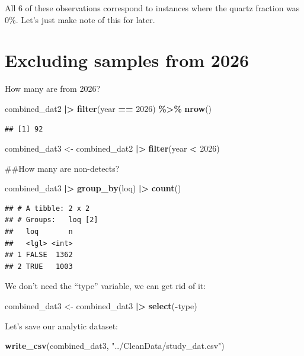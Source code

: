\documentclass[
]{article}
\newenvironment{Shaded}{\begin{snugshade}}{\end{snugshade}}
\newcommand{\DecValTok}[1]{\textcolor[rgb]{0.00,0.00,0.81}{#1}}
\newcommand{\FunctionTok}[1]{\textcolor[rgb]{0.13,0.29,0.53}{\textbf{#1}}}
\newcommand{\NormalTok}[1]{#1}
\newcommand{\OtherTok}[1]{\textcolor[rgb]{0.56,0.35,0.01}{#1}}
\newcommand{\SpecialCharTok}[1]{\textcolor[rgb]{0.81,0.36,0.00}{\textbf{#1}}}
\newcommand{\StringTok}[1]{\textcolor[rgb]{0.31,0.60,0.02}{#1}}
\begin{document}
All 6 of these observations correspond to instances where the quartz
fraction was 0\%. Let's just make note of this for later.

\section{Excluding samples from 2026}\label{excluding-samples-from-2026}

How many are from 2026?

\begin{Shaded}
\begin{Highlighting}[]
\NormalTok{combined\_dat2 }\SpecialCharTok{|\textgreater{}} 
  \FunctionTok{filter}\NormalTok{(year }\SpecialCharTok{==} \DecValTok{2026}\NormalTok{) }\SpecialCharTok{\%\textgreater{}\%} 
  \FunctionTok{nrow}\NormalTok{()}
\end{Highlighting}
\end{Shaded}

\begin{verbatim}
## [1] 92
\end{verbatim}

\begin{Shaded}
\begin{Highlighting}[]
\NormalTok{combined\_dat3 }\OtherTok{\textless{}{-}}\NormalTok{ combined\_dat2 }\SpecialCharTok{|\textgreater{}} 
  \FunctionTok{filter}\NormalTok{(year }\SpecialCharTok{\textless{}} \DecValTok{2026}\NormalTok{)}
\end{Highlighting}
\end{Shaded}

\#\#How many are non-detects?

\begin{Shaded}
\begin{Highlighting}[]
\NormalTok{combined\_dat3 }\SpecialCharTok{|\textgreater{}} 
  \FunctionTok{group\_by}\NormalTok{(loq) }\SpecialCharTok{|\textgreater{}} 
  \FunctionTok{count}\NormalTok{() }
\end{Highlighting}
\end{Shaded}

\begin{verbatim}
## # A tibble: 2 x 2
## # Groups:   loq [2]
##   loq       n
##   <lgl> <int>
## 1 FALSE  1362
## 2 TRUE   1003
\end{verbatim}

We don't need the ``type'' variable, we can get rid of it:

\begin{Shaded}
\begin{Highlighting}[]
\NormalTok{combined\_dat3 }\OtherTok{\textless{}{-}}\NormalTok{ combined\_dat3 }\SpecialCharTok{|\textgreater{}} 
  \FunctionTok{select}\NormalTok{(}\SpecialCharTok{{-}}\NormalTok{type)}
\end{Highlighting}
\end{Shaded}

Let's save our analytic dataset:

\begin{Shaded}
\begin{Highlighting}[]
\FunctionTok{write\_csv}\NormalTok{(combined\_dat3, }\StringTok{"../CleanData/study\_dat.csv"}\NormalTok{)}
\end{Highlighting}
\end{Shaded}
\end{document}

